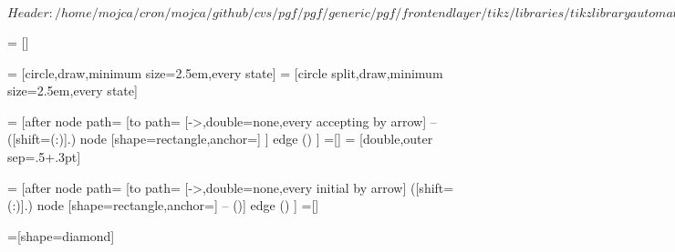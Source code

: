 %
%
%

\ProvidesFileRCS[v\pgfversion] $Header: /home/mojca/cron/mojca/github/cvs/pgf/pgf/generic/pgf/frontendlayer/tikz/libraries/tikzlibraryautomata.code.tex,v 1.2 2008/02/14 10:31:22 tantau Exp $



=           []

=  [circle,draw,minimum size=2.5em,every state]
=     [circle split,draw,minimum size=2.5em,every state]

=    [after node path=
{
  {
    [to path=
    {
      [->,double=none,every accepting by arrow]
      --
      ([shift=(\tikz@accepting@angle:\tikz@accepting@distance)]\tikztostart.\tikz@accepting@angle)
          node [shape=rectangle,anchor=\tikz@accepting@anchor] {\tikz@accepting@text}
      }]
    edge ()
  }
}]
=[]
= [double,outer sep=.5\pgflinewidth+.3pt] %

=   [after node path=
{
  {
    [to path=
    {
      [->,double=none,every initial by arrow]
      ([shift=(\tikz@initial@angle:\tikz@initial@distance)]\tikztostart.\tikz@initial@angle)
          node [shape=rectangle,anchor=\tikz@initial@anchor] {\tikz@initial@text}
        -- (\tikztostart)}]
    edge ()
  }
}]
=[]

=[shape=diamond]





\def\tikz@initial@text{start}
\def\tikz@accepting@text{}

